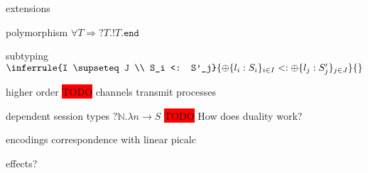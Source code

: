 \documentclass[dvipsnames]{beamer}
\newcommand{\type}[1]{\mathtt{#1}}
\newcommand{\tend}[0]{\type{end}}
\newcommand{\trecv}[1]{\type{?} #1 \type{.}}
\newcommand{\tsend}[1]{\type{!} #1 \type{.}}
\newcommand{\tselect}[2]{\type{\oplus} \{ #1 \}_{#2}}
\begin{document}
  \begin{frame}{extensions}
    \begin{block}{polymorphism}
      $\forall T \Rightarrow \trecv{T} \tsend{T} \tend$
    \end{block}
    \begin{block}{subtyping}
      $
        \inferrule
        {I \supseteq J \\ S_i <: S'_j}
        {\tselect{l_i : S_i}{i \in I} <: \tselect{l_j : S'_j}{j \in J}}
        {}
      $
    \end{block}
    \begin{block}{higher order}
      \colorbox{red}{TODO}
      channels transmit processes
    \end{block}
    \begin{block}{dependent session types}
      $\trecv{\mathbb{N}} \lambda n \rightarrow S$
      \colorbox{red}{TODO} How does duality work?
    \end{block}
  \end{frame}

  \begin{frame}{encodings}
    correspondence with linear picalc

    effects?
  \end{frame}
\end{document}
